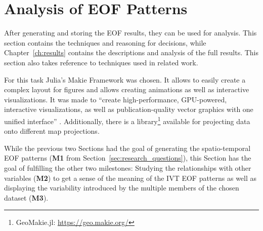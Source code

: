 \section{Analysis of EOF Patterns}
\label{sec:vis_analysis}

After generating and storing the EOF results, they can be used for analysis. 
This section contains the techniques and reasoning for decisions, while Chapter~\ref{ch:results} contains the descriptions and analysis of the full results. 
This section also takes reference to techniques used in related work. 

For this task Julia's Makie Framework \cite{danisch_makiejl_2021} was chosen. 
It allows to easily create a complex layout for figures and allows creating animations as well as interactive visualizations. 
It was made to \enquote{create high-performance, GPU-powered, interactive visualizations, as well as publication-quality vector graphics with one unified interface} \cite{danisch_makiejl_2021}. 
Additionally, there is a library\footnote{GeoMakie.jl: \url{https://geo.makie.org/}} available for projecting data onto different map projections. 


While the previous two Sections had the goal of generating the spatio-temporal EOF patterns (\textbf{M1} from Section~\ref{sec:research_questions}), this Section has the goal of fulfilling the other two milestones:  
Studying the relationships with other variables (\textbf{M2}) to get a sense of the meaning of the IVT EOF patterns as well as displaying the variability introduced by the multiple members of the chosen dataset (\textbf{M3}). 

